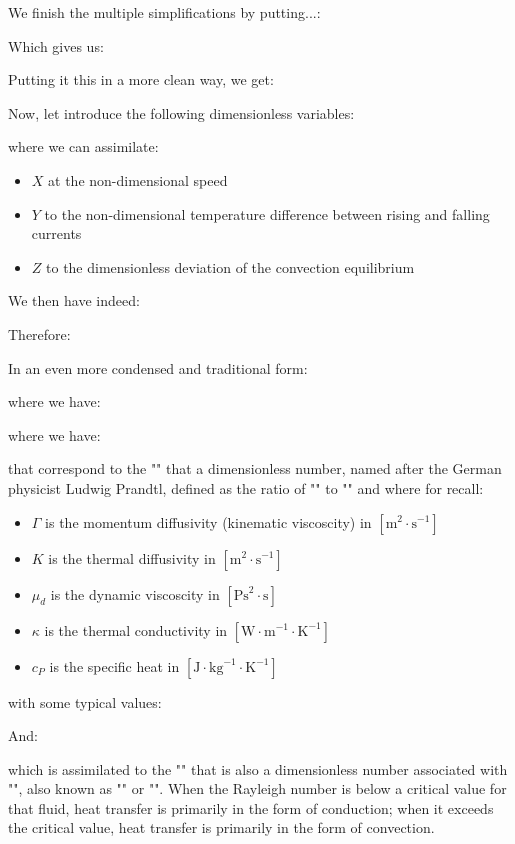 	We finish the multiple simplifications by putting...:
	
	Which gives us:
	
	Putting it this in a more clean way, we get:
	
	Now, let introduce the following dimensionless variables:
	
	where we can assimilate:
	\begin{itemize}
		\item $X$ at the non-dimensional speed

		\item $Y$ to the non-dimensional temperature difference between rising and falling currents

		\item $Z$ to the dimensionless deviation of the convection equilibrium
	\end{itemize}
	We then have indeed:
	
	Therefore:
	
	In an even more condensed and traditional form:
	
	where we have:
	
	where we have:
	
	that correspond to the "" that a dimensionless number, named after the German physicist Ludwig Prandtl, defined as the ratio of "" to "" and where for recall:
	\begin{itemize}
		\item $\Gamma$ is the momentum diffusivity (kinematic viscoscity) in $[\text{m}^2\cdot \text{s}^{-1}]$
		\item $K$ is the thermal diffusivity in $[\text{m}^2\cdot \text{s}^{-1}]$
		\item $\mu_d$ is the dynamic viscoscity in $[\text{Ps}^2\cdot \text{s}]$
		\item $\kappa$ is the thermal conductivity in $[\text{W}\cdot \text{m}^{-1}\cdot\text{K}^{-1}]$
		\item $c_P$ is the specific heat in $[\text{J}\cdot\text{kg}^{-1}\cdot\text{K}^{-1}]$
	\end{itemize}
	with some typical values:
	
	And:
	
	which is assimilated to the ""  that is also a dimensionless number associated with "", also known as "" or "". When the Rayleigh number is below a critical value for that fluid, heat transfer is primarily in the form of conduction; when it exceeds the critical value, heat transfer is primarily in the form of convection.
	
